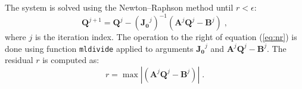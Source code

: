 \documentclass{deltares_manual}
\begin{document}
The system is solved using the Newton–Raphson method until $r<\epsilon$:
\begin{equation}
\label{eq:nr}
\mathbf{Q}^{j+1}=\mathbf{Q}^{j}-(\mathbf{J_0}^{j})^{-1}\left(\mathbf{A}^{j}\mathbf{Q}^{j}-\mathbf{B}^{j}\right) \;,
\end{equation}
where $j$ is the iteration index. The operation to the right of equation (\ref{eq:nr}) is done using function \texttt{mldivide} applied to arguments $\mathbf{J_0}^{j}$ and $\mathbf{A}^{j}\mathbf{Q}^{j}-\mathbf{B}^{j}$. The residual $r$ is computed as:
\begin{equation}
r=\max{\left|\left(\mathbf{A}^{j}\mathbf{Q}^{j}-\mathbf{B}^{j}\right)\right|} \;.
\end{equation}



%
%
%
%
\end{document}
